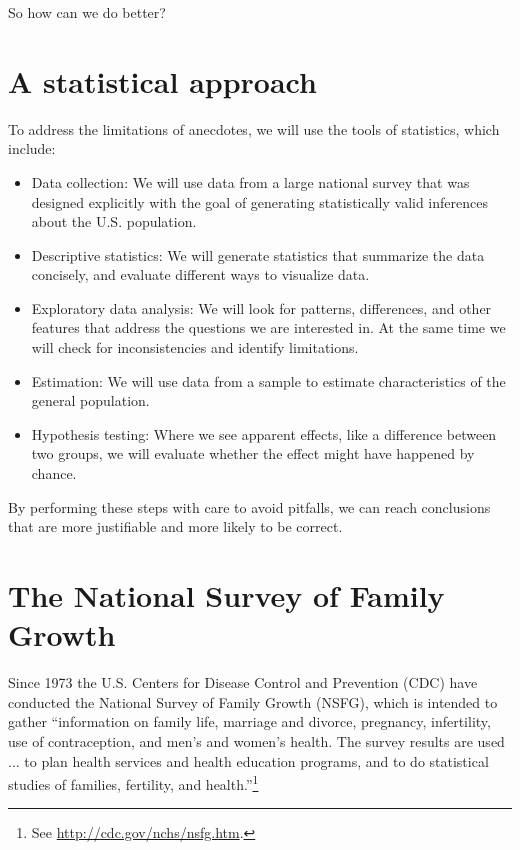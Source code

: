 \documentclass[12pt]{book}
\begin{document}
So how can we do better?


\section{A statistical approach}

To address the limitations of anecdotes, we will use the tools
of statistics, which include:

\begin{itemize}

\item Data collection: We will use data from a large national survey
  that was designed explicitly with the goal of generating
  statistically valid inferences about the U.S. population.

\item Descriptive statistics: We will generate statistics that
  summarize the data concisely, and evaluate different ways to
  visualize data.

\item Exploratory data analysis: We will look for
  patterns, differences, and other features that address the questions
  we are interested in.  At the same time we will check for
  inconsistencies and identify limitations.

\item Estimation: We will use data from a sample to estimate
  characteristics of the general population.

\item Hypothesis testing: Where we see apparent effects, like a
  difference between two groups, we will evaluate whether the effect
  might have happened by chance.

\end{itemize}

By performing these steps with care to avoid pitfalls, we can
reach conclusions that are more justifiable and more likely to be
correct.


\section{The National Survey of Family Growth}
\label{nsfg}

Since 1973 the U.S. Centers for Disease Control and Prevention (CDC)
have conducted the National Survey of Family Growth (NSFG),
which is intended to gather ``information on family life, marriage and
divorce, pregnancy, infertility, use of contraception, and men's and
women's health. The survey results are used ... to plan health services and
health education programs, and to do statistical studies of families,
fertility, and health.''\footnote{See
  \url{http://cdc.gov/nchs/nsfg.htm}.}
\end{document}
